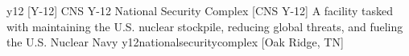 \newglsXinstitution%
{y12}%
[Y{\--}12]%
{CNS Y{\--}12 National Security Complex}%
[CNS Y{\--}12]%
{A  facility tasked with maintaining the U.S. nuclear stockpile, reducing global threats, and fueling the U.S. Nuclear Navy \cite{website:Y12}}%
{y12nationalsecuritycomplex}%
[Oak Ridge, TN]%